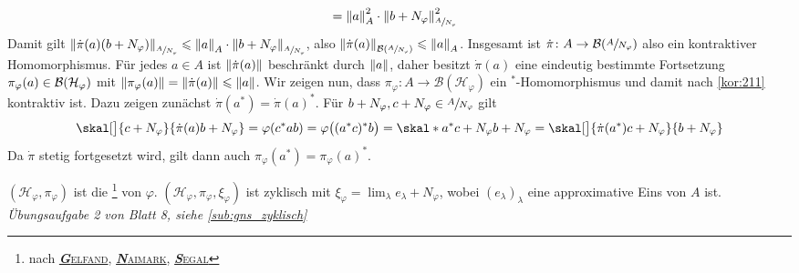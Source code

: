 \begin{satz}[{name={GNS-Konstruktion}},label=gns]
\begin{align}
		&= \norm*{a}_A^2 \cdot \norm*{b+N_\varphi}^2_{\sfrac{A}{N_\varphi}}
	\end{align}
	Damit gilt $\norm*{\dot{\pi}(a)(b+N_\varphi)}_{\sfrac{A}{N_\varphi}} \le \norm*{a}_A \cdot \norm*{b+N_\varphi}_{\sfrac{A}{N_\varphi}}$, also $\norm*{\dot{\pi}(a)}_{\mathcal{B}(\sfrac{A}{N_\varphi})} \le \norm*{a}_A$.
	Insgesamt ist $\dot{\pi}\colon A \to \mathcal{B}(\sfrac{A}{N_\varphi})$ also ein kontraktiver Homomorphismus.
	Für jedes $a \in A$ ist $\norm*{\dot{\pi}(a)}$ beschränkt durch $\norm*{a}$, daher besitzt $\dot{\pi}(a)$ eine eindeutig bestimmte Fortsetzung $\pi_\varphi(a) \in \mathcal{B}\enbrace{\mathcal{H}_\varphi}$ mit $\norm*{\pi_\varphi(a)} = \norm*{\dot{\pi}(a)}\le \norm*{a}$.
	Wir zeigen nun, dass $\pi_\varphi \colon A \to \mathcal{B}(\mathcal{H}_\varphi)$ ein $^*$-Homomorphismus und damit nach \autoref{kor:211} kontraktiv ist.
	Dazu zeigen zunächst $\dot{\pi}(a^*)=\dot{\pi}(a)^*$. Für $b +N_\varphi,c+N_\varphi \in \sfrac{A}{N_\varphi}$ gilt
	\[
		\skal[\big]{c+N_\varphi}{\dot{\pi}(a) b+N_\varphi} = \varphi(c^*ab) = \varphi \enbrace[\big]{(a^*c)^*b} = \skal*{a^*c +N_\varphi}{b+N_\varphi}= \skal[\big]{\dot{\pi}(a^*)c+N_\varphi}{b+N_\varphi}
	\]
	Da $\dot{\pi}$ stetig fortgesetzt wird, gilt dann auch $\pi_\varphi(a^*)=\pi_\varphi(a)^*$.
	
	$(\mathcal{H}_\varphi,\pi_\varphi)$ ist die \footnote{nach \href{https://de.wikipedia.org/wiki/Israel_Moissejewitsch_Gelfand}{\textsc{\textbf{\emph{G}}elfand}}, \href{https://de.wikipedia.org/wiki/Mark_Neumark}{\textsc{\textbf{\emph{N}}aimark}}, \href{https://de.wikipedia.org/wiki/Irving_Segal}{\textsc{\textbf{\emph{S}}egal}}} von $\varphi$.
	$(\mathcal{H}_\varphi,\pi_\varphi,\xi_\varphi)$ ist zyklisch mit $\xi_\varphi = \lim_\lambda e_\lambda+N_\varphi$, wobei $(e_\lambda)_\lambda$ eine approximative Eins von $A$ ist. \emph{Übungsaufgabe 2 von Blatt 8, siehe \cref{sub:gns_zyklisch}}
\end{satz}

